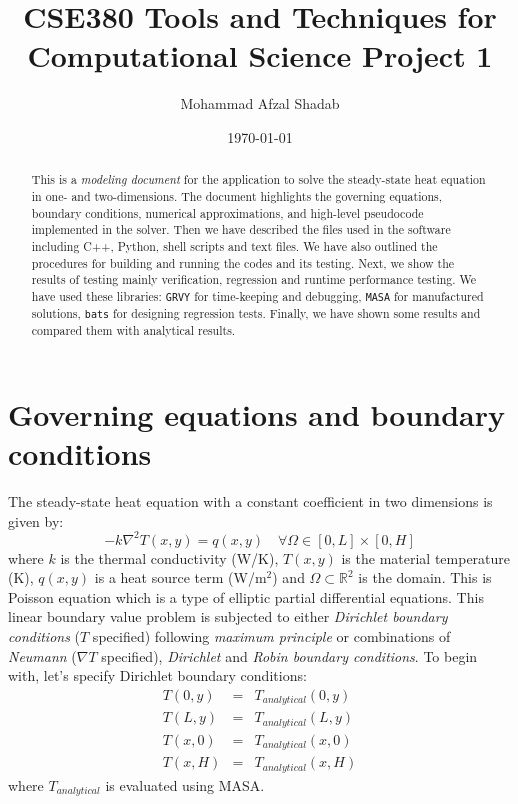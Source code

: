 \documentclass[12pt]{amsart}   %
\begin{document}
\title[CSE380 Project 1]{CSE380 Tools and Techniques for Computational Science Project 1  \\[Modeling document]} 
 
\author{Mohammad Afzal Shadab}
\date{\today}              %


\newcommand{\C}{\mathbb C} %
\newcommand{\R}{\mathbb R} 
\newcommand{\Z}{\mathbb Z}
\newcommand{\Q}{\mathbb Q}
\newcommand{\N}{\mathbb N}

\begin{abstract}
This is a \textit{modeling document} for the application to solve the steady-state heat equation in one- and two-dimensions. The document highlights the governing equations, boundary conditions, numerical approximations, and high-level pseudocode implemented in the solver. Then we have described the files used in the software including C++, Python, shell scripts and text files. We have also outlined the procedures for building and running the codes and its testing. Next, we show the results of testing mainly verification, regression and runtime performance testing. We have used these libraries: {\tt{GRVY}} for time-keeping and debugging, {\tt{MASA}} for manufactured solutions, {\tt{bats}} for designing regression tests. Finally, we have shown some results and compared them with analytical results.
\end{abstract}

\maketitle

\section{Governing equations and boundary conditions\label{sec:goveqn}}
The steady-state heat equation with a constant coefficient in two dimensions is given by:
\begin{equation} \label{eq:1}
    \boxed{-k \nabla^2T(x,y) = q(x,y) \quad \forall \Omega\in[0,L]\times[0,H]}
\end{equation}
where $k$ is the thermal conductivity (W/K), $T(x,y)$ is the material temperature (K), $q(x,y)$ is a heat source term (W/m$^2$) and $\Omega \subset \mathbb{R}^2$ is the domain. This is Poisson equation which is a type of elliptic partial differential equations. This linear boundary value problem is subjected to either \textit{Dirichlet boundary conditions} ($T$ specified) following \textit{maximum principle} or combinations of \textit{Neumann} ($\nabla T$ specified), \textit{Dirichlet} and \textit{Robin boundary conditions}. To begin with, let's specify Dirichlet boundary conditions:
\begin{eqnarray}
T(0,y) &=& T_{analytical}(0,y) \nonumber\\
T(L,y) &=& T_{analytical}(L,y)\\
T(x,0) &=& T_{analytical}(x,0)\nonumber\\
T(x,H) &=& T_{analytical}(x,H)\nonumber
\end{eqnarray}
where $T_{analytical}$ is evaluated using MASA.
\end{document}
